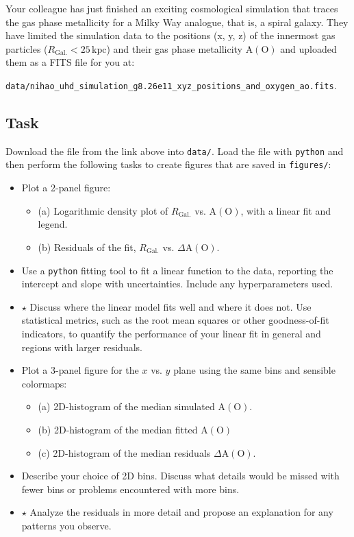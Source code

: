 \documentclass[a4paper,12pt]{article}
\begin{document}
Your colleague has just finished an exciting cosmological simulation that traces the gas phase metallicity for a Milky Way analogue, that is, a spiral galaxy. They have limited the simulation data to the positions (x, y, z) of the innermost gas particles ($R_\mathrm{Gal.} < 25\,\mathrm{kpc}$) and their gas phase metallicity $\mathrm{A(O)}$ and uploaded them as a FITS file for you at:

\texttt{data/nihao\_uhd\_simulation\_g8.26e11\_xyz\_positions\_and\_oxygen\_ao.fits}.

\subsection{Task}

Download the file from the link above into \texttt{data/}. Load the file with \texttt{python} and then perform the following tasks to create figures that are saved in \texttt{figures/}:

\begin{itemize}
\item Plot a 2-panel figure:
    \begin{itemize}
    \item (a) Logarithmic density plot of $R_\mathrm{Gal.}$ vs. $\mathrm{A(O)}$, with a linear fit and legend.
    \item (b) Residuals of the fit, $R_\mathrm{Gal.}$ vs. $\Delta \mathrm{A(O)}$.
    \end{itemize}
\item Use a \texttt{python} fitting tool to fit a linear function to the data, reporting the intercept and slope with uncertainties. Include any hyperparameters used.
\item  $\star$ Discuss where the linear model fits well and where it does not. Use statistical metrics, such as the root mean squares or other goodness-of-fit indicators, to quantify the performance of your linear fit in general and regions with larger residuals.
\item Plot a 3-panel figure for the $x$ vs. $y$ plane using the same bins and sensible colormaps:
    \begin{itemize}
    \item (a) 2D-histogram of the median simulated $\mathrm{A(O)}$.
    \item (b) 2D-histogram of the median fitted $\mathrm{A(O)}$
    \item (c) 2D-histogram of the median residuals $\Delta \mathrm{A(O)}$.
    \end{itemize}
\item Describe your choice of 2D bins. Discuss what details would be missed with fewer bins or problems encountered with more bins.
\item $\star$ Analyze the residuals in more detail and propose an explanation for any patterns you observe.
\end{itemize}
\end{document}
